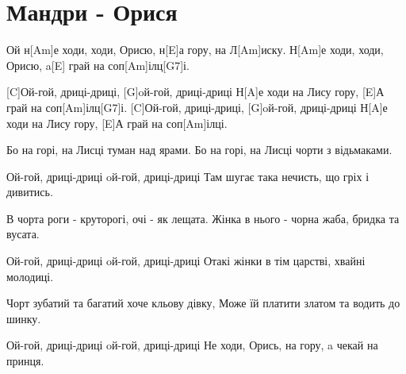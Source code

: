 \section{Мандри - Орися}
\begin{guitar}

Ой н[Am]е ходи, ходи, Орисю, н[E]а гору, на Л[Am]иску.
Н[Am]е ходи, ходи, Орисю, a[E] грай на соп[Am]ілц[G7]і.

[C]Ой-гой, дриці-дриці, [G]oй-гой, дриці-дриці
Н[A]е ходи на Лису гору, [E]А грай на соп[Am]ілц[G7]і.
[C]Ой-гой, дриці-дриці, [G]oй-гой, дриці-дриці
Н[A]е ходи на Лису гору, [E]А грай на соп[Am]ілці.

Бо на горі, на Лисці туман над ярами.
Бо на горі, на Лисці чорти з відьмаками.

Ой-гой, дриці-дриці oй-гой, дриці-дриці
Там шугає така нечисть, що гріх і дивитись.

В чорта роги - круторогі, очі - як лещата.
Жінка в нього - чорна жаба, бридка та вусата.

Ой-гой, дриці-дриці oй-гой, дриці-дриці 
Отакі жінки в тім царстві, хвайні молодиці.

Чорт зубатий та багатий хоче кльову дівку,
Може їй платити златом та водить до шинку.

Ой-гой, дриці-дриці oй-гой, дриці-дриці 
Не ходи, Орись, на гору, a чекай на принця.
\end{guitar}
